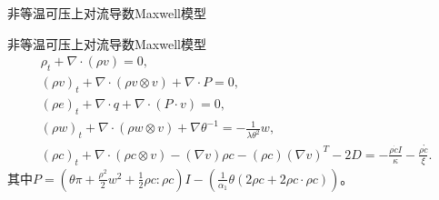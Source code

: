 \documentclass[mathserif]{beamer}
\begin{document}

\begin{frame}{非等温可压上对流导数Maxwell模型}
\begin{block}{非等温可压上对流导数Maxwell模型}
\begin{subequations} \label{eq:ECDFsecond}
		\begin{align*}
			\rho_t + \nabla \cdot (\rho v) = 0 ,\\
			(\rho v)_t + \nabla \cdot (\rho v \otimes v) + \nabla \cdot P =0 ,\\
			(\rho e)_t + \nabla \cdot q + \nabla \cdot (P \cdot v) = 0, \\
			(\rho w)_t + \nabla \cdot (\rho w \otimes v) + \nabla \theta^{-1} = -\frac{1}{\lambda \theta^2} w, \\
			(\rho c)_t +  \nabla \cdot (\rho c \otimes v) - (\nabla v) \rho c - (\rho c) (\nabla v)^T - 2 D = - \frac{\rho \dot{c}I}{\kappa} -  \frac{\rho \mathring{c}}{\xi}  .
		\end{align*}
	\end{subequations}
	其中$ P= (\theta\pi +\frac{\rho^2}{2} w^2 + \frac{1}{2} \rho c: \rho c) I  - ( \frac{1}{\alpha_1}  \theta (2 \rho c + 2 \rho c \cdot \rho c))$。
	\end{block}
\end{frame}
\end{document}
